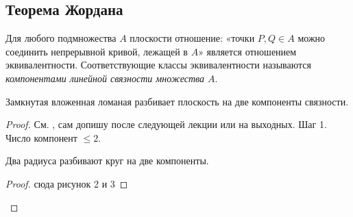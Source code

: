 \subsection{Теорема Жордана}
\begin{definition}
    Для любого подмножества $A$ плоскости отношение: «точки $P,Q \in A$ можно соединить непрерывной кривой, лежащей в $A$» является отношением эквивалентности. Соответствующие классы эквивалентности называются \textit{компонентами линейной связности множества $A$}.
\end{definition}

\begin{theorem}
    Замкнутая вложенная ломаная разбивает плоскость на две компоненты связности. %
\end{theorem}
\begin{proof}
    См. \cite{oshemkov}, сам допишу после следующей лекции или на выходных.
    Шаг 1. Число компонент $\leq 2$.
    \begin{lemma}
        Два радиуса разбивают круг на две компоненты.
    \end{lemma}
    \begin{proof}
        сюда рисунок 2 и 3
    \end{proof}
\end{proof}